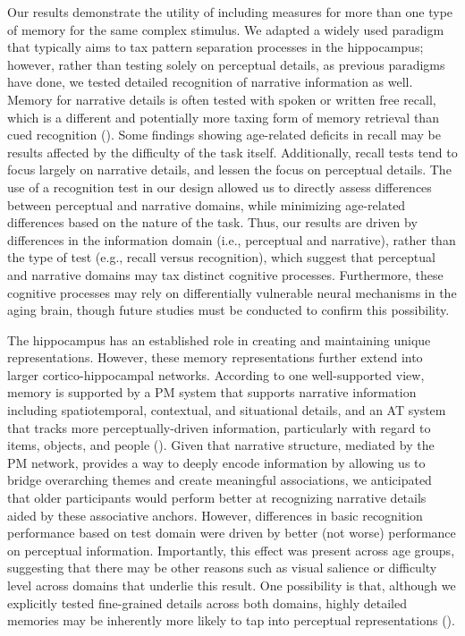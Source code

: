 \documentclass[11pt]{article}
\begin{document}
Our results demonstrate the utility of including measures for more than one type of memory for the same complex stimulus. We adapted a widely used paradigm that typically aims to tax pattern separation processes in the hippocampus; however, rather than testing solely on perceptual details, as previous paradigms have done, we tested detailed recognition of narrative information as well. Memory for narrative details is often tested with spoken or written free recall, which is a different and potentially more taxing form of memory retrieval than cued recognition (\cite{craik_age_nodate}). Some findings showing age-related deficits in recall may be results affected by the difficulty of the task itself. Additionally, recall tests tend to focus largely on narrative details, and lessen the focus on perceptual details. The use of a recognition test in our design allowed us to directly assess differences between perceptual and narrative domains, while minimizing age-related differences based on the nature of the task. Thus, our results are driven by differences in the information domain (i.e., perceptual and narrative), rather than the type of test (e.g., recall versus recognition), which suggest that perceptual and narrative domains may tax distinct cognitive processes. Furthermore, these cognitive processes may rely on differentially vulnerable neural mechanisms in the aging brain, though future studies must be conducted to confirm this possibility. 	 

The hippocampus has an established role in creating and maintaining unique representations. However, these memory representations further extend into larger cortico-hippocampal networks. According to one well-supported view, memory is supported by a PM system that supports narrative information including spatiotemporal, contextual, and situational details, and an AT system that tracks more perceptually-driven information, particularly with regard to items, objects, and people (\cite{ranganath_two_2012, ritchey_cortico-hippocampal_2015}). Given that narrative structure, mediated by the PM network, provides a way to deeply encode information by allowing us to bridge overarching themes and create meaningful associations, we anticipated that older participants would perform better at recognizing narrative details aided by these associative anchors. However, differences in basic recognition performance based on test domain were driven by better (not worse) performance on perceptual information. Importantly, this effect was present across age groups, suggesting that there may be other reasons such as visual salience or difficulty level across domains that underlie this result. One possibility is that, although we explicitly tested fine-grained details across both domains, highly detailed memories may be inherently more likely to tap into perceptual representations (\cite{robin_details_2017}).
\end{document}
